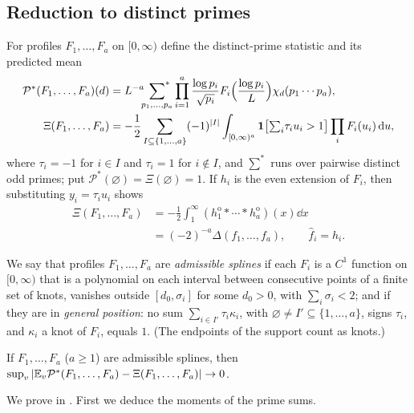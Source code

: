 \documentclass[11pt,colorlinks]{charlie}
\newcommand{\ho}[1]{#1^{\mathrm{o}}}
\begin{document}
\subsection{Reduction to distinct primes}
For profiles $F_1,\dots,F_a$ on $[0,\infty)$ define the distinct-prime statistic and its predicted mean
\begin{align*}
 \mathcal P^*(F_1,\dots,F_a)(d)&=L^{-a}\sideset{}{^*}\sum_{p_1,\dots,p_a}\prod_{i=1}^a\frac{\log p_i}{\sqrt{p_i}}F_i\Big(\frac{\log p_i}L\Big)\chi_d(p_1\cdots p_a),\\
 \Xi(F_1,\dots,F_a)&=-\frac12\sum_{I\subseteq\{1,\dots,a\}}(-1)^{|I|}\int_{[0,\infty)^a}\mathbf{1}\big[{\textstyle\sum_i}\tau_iu_i>1\big]\prod_iF_i(u_i)\,\mathrm{d} u,
\end{align*}
where $\tau_i=-1$ for $i\in I$ and $\tau_i=1$ for $i\notin I$, and $\sum^*$ runs over pairwise distinct odd primes; put $\mathcal P^*(\varnothing)=\Xi(\varnothing)=1$. If $h_i$ is the even extension of $F_i$, then substituting $y_i=\tau_iu_i$ shows
\begin{equation}\label{eq:Xi-Delta}
\begin{split}
 \Xi(F_1,\dots,F_a)&=-\frac12\int_1^\infty(\ho h_1*\cdots*\ho h_a)(x)\dd x\\
 &=(-2)^{-a}\Delta(f_1,\dots,f_a),\qquad \widehat f_i=h_i.
\end{split}
\end{equation}

We say that profiles $F_1,\dots,F_a$ are \emph{admissible splines} if each $F_i$ is a $C^1$ function on $[0,\infty)$ that is a polynomial on each interval between consecutive points of a finite set of knots, vanishes outside $[d_0,\sigma_i]$ for some $d_0>0$, with $\sum_i\sigma_i<2$; and if they are in \emph{general position}: no sum $\sum_{i\in I'}\tau_i\kappa_i$, with $\varnothing\ne I'\subseteq\{1,\dots,a\}$, signs $\tau_i$, and $\kappa_i$ a knot of $F_i$, equals $1$. (The endpoints of the support count as knots.)

\begin{proposition}\label{prop:distinct}
If $F_1,\dots,F_a$ ($a\ge1$) are admissible splines, then $\sup_v|\mathbb{E}_v\mathcal P^*(F_1,\dots,F_a)-\Xi(F_1,\dots,F_a)|\to0$.
\end{proposition}

We prove  in . First we deduce the moments of the prime sums.
\end{document}

